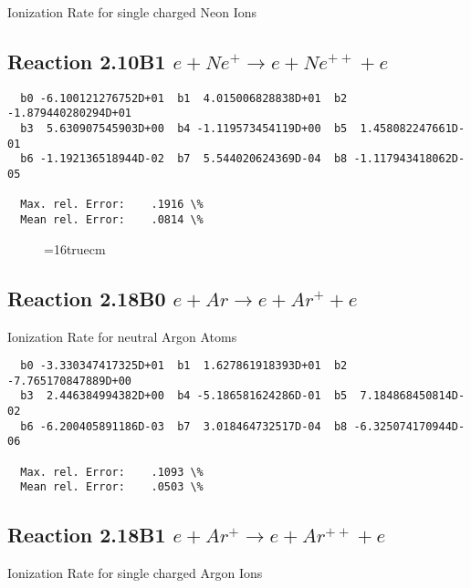 \documentclass[12pt,dvipdfmx]{article}
\begin{document}
 Ionization Rate for single charged Neon Ions

\subsection{
Reaction 2.10B1  $ e + Ne^+ \rightarrow e + Ne^{++} + e $
}

\begin{small}\begin{verbatim}
  b0 -6.100121276752D+01  b1  4.015006828838D+01  b2 -1.879440280294D+01
  b3  5.630907545903D+00  b4 -1.119573454119D+00  b5  1.458082247661D-01
  b6 -1.192136518944D-02  b7  5.544020624369D-04  b8 -1.117943418062D-05

  Max. rel. Error:    .1916 \%
  Mean rel. Error:    .0814 \%

\end{verbatim}\end{small}


\begin{figure} \label{2.10B0}
\epsfxsize=16truecm
\end{figure}

\newpage

\subsection{
Reaction 2.18B0   $e + Ar  \rightarrow e + Ar^+  + e$
}

  Ionization Rate for neutral Argon Atoms

\begin{small}\begin{verbatim}
  b0 -3.330347417325D+01  b1  1.627861918393D+01  b2 -7.765170847889D+00
  b3  2.446384994382D+00  b4 -5.186581624286D-01  b5  7.184868450814D-02
  b6 -6.200405891186D-03  b7  3.018464732517D-04  b8 -6.325074170944D-06

  Max. rel. Error:    .1093 \%
  Mean rel. Error:    .0503 \%

\end{verbatim}\end{small}



\subsection{
Reaction 2.18B1   $e + Ar^+ \rightarrow e + Ar^{++} + e$
}

  Ionization Rate for single charged Argon Ions
\end{document}
